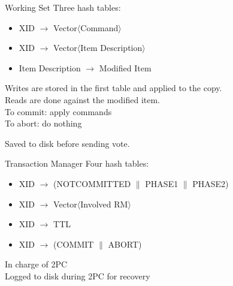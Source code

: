 \documentclass{beamer}
\begin{document}
\begin{frame}{Working Set}
  Three hash tables:

  \begin{itemize}
  \item XID $\to$ Vector$\langle$Command$\rangle$
  \item XID $\to$ Vector$\langle$Item Description$\rangle$
  \item Item Description $\to$ Modified Item
  \end{itemize}


   Writes are stored in the first table and applied to the copy. \\
   Reads are done against the modified item. \\
   To commit: apply commands \\
   To abort: do nothing

   Saved to disk before sending vote.
\end{frame}



\begin{frame}{Transaction Manager}
  Four hash tables:

  \begin{itemize}
  \item XID $\to$ (NOTCOMMITTED $\|$ PHASE1 $\|$ PHASE2)
  \item XID $\to$ Vector$\langle$Involved RM$\rangle$
  \item XID $\to$ TTL
  \item XID $\to$ (COMMIT $\|$ ABORT)
  \end{itemize}

  In charge of 2PC \\
  Logged to disk during 2PC for recovery \\
\end{frame}
\end{document}
